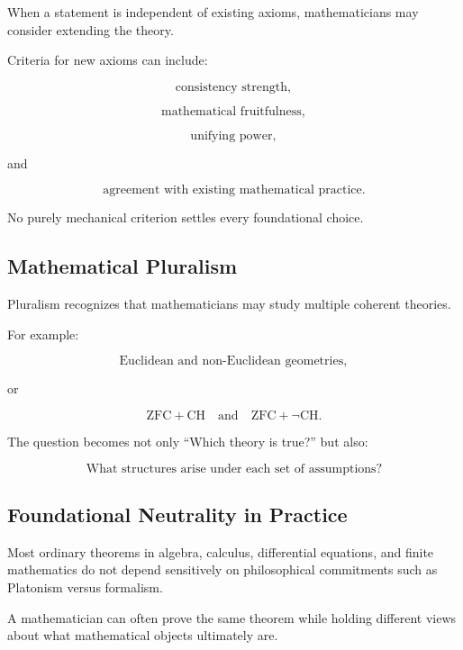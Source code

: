 When a statement is independent of existing axioms, mathematicians may
consider extending the theory.

Criteria for new axioms can include:

\[
\boxed{
\text{consistency strength},
}
\]

\[
\boxed{
\text{mathematical fruitfulness},
}
\]

\[
\boxed{
\text{unifying power},
}
\]

and

\[
\boxed{
\text{agreement with existing mathematical practice}.
}
\]

No purely mechanical criterion settles every foundational choice.

\subsection{Mathematical Pluralism}
\label{subsec:mathematical-pluralism}

Pluralism recognizes that mathematicians may study multiple coherent
theories.

For example:

\[
\boxed{
\text{Euclidean and non-Euclidean geometries},
}
\]

or

\[
\boxed{
\mathrm{ZFC}+\mathrm{CH}
\quad\text{and}\quad
\mathrm{ZFC}+\neg\mathrm{CH}.
}
\]

The question becomes not only ``Which theory is true?'' but also:

\[
\boxed{
\text{What structures arise under each set of assumptions?}
}
\]

\subsection{Foundational Neutrality in Practice}
\label{subsec:foundational-neutrality}

Most ordinary theorems in algebra, calculus, differential equations, and
finite mathematics do not depend sensitively on philosophical commitments
such as Platonism versus formalism.

A mathematician can often prove the same theorem while holding different
views about what mathematical objects ultimately are.

